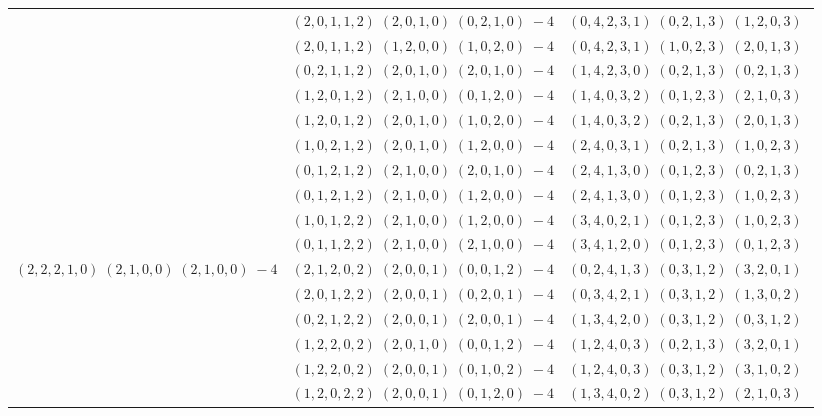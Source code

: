 \documentclass[11pt]{article}
\begin{document}
\begin{longtable}[l]{|c|c|c|}
 \cline{2-3} 
 & $(2 ,0 ,1 ,1 ,2) \;(2 ,0 ,1 ,0) \;(0 ,2 ,1 ,0) \;-4$ & $(0 ,4 ,2 ,3 ,1) \;(0 ,2 ,1 ,3) \;(1 ,2 ,0 ,3) \;$\\ 
 \cline{2-3} 
 & $(2 ,0 ,1 ,1 ,2) \;(1 ,2 ,0 ,0) \;(1 ,0 ,2 ,0) \;-4$ & $(0 ,4 ,2 ,3 ,1) \;(1 ,0 ,2 ,3) \;(2 ,0 ,1 ,3) \;$\\ 
 \cline{2-3} 
 & $(0 ,2 ,1 ,1 ,2) \;(2 ,0 ,1 ,0) \;(2 ,0 ,1 ,0) \;-4$ & $(1 ,4 ,2 ,3 ,0) \;(0 ,2 ,1 ,3) \;(0 ,2 ,1 ,3) \;$\\ 
 \cline{2-3} 
 & $(1 ,2 ,0 ,1 ,2) \;(2 ,1 ,0 ,0) \;(0 ,1 ,2 ,0) \;-4$ & $(1 ,4 ,0 ,3 ,2) \;(0 ,1 ,2 ,3) \;(2 ,1 ,0 ,3) \;$\\ 
 \cline{2-3} 
 & $(1 ,2 ,0 ,1 ,2) \;(2 ,0 ,1 ,0) \;(1 ,0 ,2 ,0) \;-4$ & $(1 ,4 ,0 ,3 ,2) \;(0 ,2 ,1 ,3) \;(2 ,0 ,1 ,3) \;$\\ 
 \cline{2-3} 
 & $(1 ,0 ,2 ,1 ,2) \;(2 ,0 ,1 ,0) \;(1 ,2 ,0 ,0) \;-4$ & $(2 ,4 ,0 ,3 ,1) \;(0 ,2 ,1 ,3) \;(1 ,0 ,2 ,3) \;$\\ 
 \cline{2-3} 
 & $(0 ,1 ,2 ,1 ,2) \;(2 ,1 ,0 ,0) \;(2 ,0 ,1 ,0) \;-4$ & $(2 ,4 ,1 ,3 ,0) \;(0 ,1 ,2 ,3) \;(0 ,2 ,1 ,3) \;$\\ 
 \cline{2-3} 
 & $(0 ,1 ,2 ,1 ,2) \;(2 ,1 ,0 ,0) \;(1 ,2 ,0 ,0) \;-4$ & $(2 ,4 ,1 ,3 ,0) \;(0 ,1 ,2 ,3) \;(1 ,0 ,2 ,3) \;$\\ 
 \cline{2-3} 
 & $(1 ,0 ,1 ,2 ,2) \;(2 ,1 ,0 ,0) \;(1 ,2 ,0 ,0) \;-4$ & $(3 ,4 ,0 ,2 ,1) \;(0 ,1 ,2 ,3) \;(1 ,0 ,2 ,3) \;$\\ 
 \cline{2-3} 
 & $(0 ,1 ,1 ,2 ,2) \;(2 ,1 ,0 ,0) \;(2 ,1 ,0 ,0) \;-4$ & $(3 ,4 ,1 ,2 ,0) \;(0 ,1 ,2 ,3) \;(0 ,1 ,2 ,3) \;$\\ \hline\multirow[t]{7}{*}{ $(2 ,2 ,2 ,1 ,0) \;(2 ,1 ,0 ,0) \;(2 ,1 ,0 ,0) \;-4$ }  & $(2 ,1 ,2 ,0 ,2) \;(2 ,0 ,0 ,1) \;(0 ,0 ,1 ,2) \;-4$ & $(0 ,2 ,4 ,1 ,3) \;(0 ,3 ,1 ,2) \;(3 ,2 ,0 ,1) \;$\\ 
 \cline{2-3} 
 & $(2 ,0 ,1 ,2 ,2) \;(2 ,0 ,0 ,1) \;(0 ,2 ,0 ,1) \;-4$ & $(0 ,3 ,4 ,2 ,1) \;(0 ,3 ,1 ,2) \;(1 ,3 ,0 ,2) \;$\\ 
 \cline{2-3} 
 & $(0 ,2 ,1 ,2 ,2) \;(2 ,0 ,0 ,1) \;(2 ,0 ,0 ,1) \;-4$ & $(1 ,3 ,4 ,2 ,0) \;(0 ,3 ,1 ,2) \;(0 ,3 ,1 ,2) \;$\\ 
 \cline{2-3} 
 & $(1 ,2 ,2 ,0 ,2) \;(2 ,0 ,1 ,0) \;(0 ,0 ,1 ,2) \;-4$ & $(1 ,2 ,4 ,0 ,3) \;(0 ,2 ,1 ,3) \;(3 ,2 ,0 ,1) \;$\\ 
 \cline{2-3} 
 & $(1 ,2 ,2 ,0 ,2) \;(2 ,0 ,0 ,1) \;(0 ,1 ,0 ,2) \;-4$ & $(1 ,2 ,4 ,0 ,3) \;(0 ,3 ,1 ,2) \;(3 ,1 ,0 ,2) \;$\\ 
 \cline{2-3} 
 & $(1 ,2 ,0 ,2 ,2) \;(2 ,0 ,0 ,1) \;(0 ,1 ,2 ,0) \;-4$ & $(1 ,3 ,4 ,0 ,2) \;(0 ,3 ,1 ,2) \;(2 ,1 ,0 ,3) \;$\\ 

\end{longtable}
\end{document}
